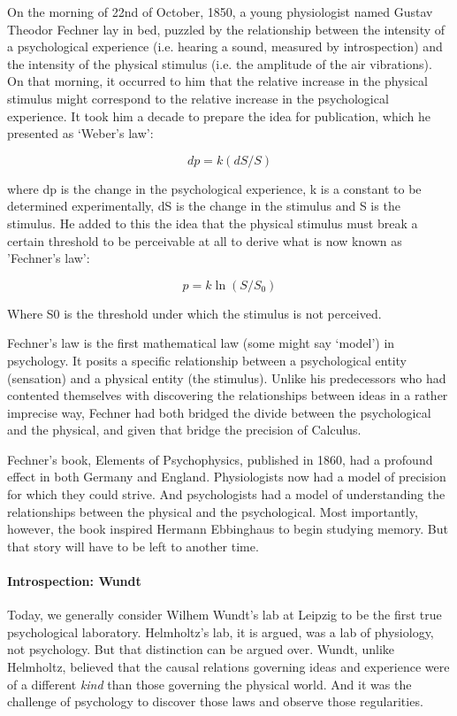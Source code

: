 On the morning of 22nd of October, 1850, a young physiologist named Gustav Theodor Fechner lay in bed, puzzled by the relationship between the intensity of a psychological experience (i.e. hearing a sound, measured by introspection) and the intensity of the physical stimulus (i.e. the amplitude of the air vibrations). On that morning, it occurred to him that the relative increase in the physical stimulus might correspond to the relative increase in the psychological experience. It took him a decade to prepare the idea for publication, which he presented as `Weber's law':

\[ dp  = k(dS/S) \]

where dp is the change in the psychological experience, k is a constant to be determined experimentally, dS is the change in the stimulus and S is the stimulus. He added to this the idea that the physical stimulus must break a certain threshold to be perceivable at all to derive what is now known as 'Fechner's law’:

\[ p = k\ln(S/S_{0}) \] 

Where S0 is the threshold under which the stimulus is not perceived.

Fechner's law is the first mathematical law (some might say `model') in psychology. It posits a specific relationship between a psychological entity (sensation) and a physical entity (the stimulus). Unlike his predecessors who had contented themselves with discovering the relationships between ideas in a rather imprecise way, Fechner had both bridged the divide between the psychological and the physical, and given that bridge the precision of Calculus. 

Fechner's book, Elements of Psychophysics, published in 1860, had a profound effect in both Germany and England. Physiologists now had a model of precision for which they could strive. And psychologists had a model of understanding the relationships between the physical and the psychological. Most importantly, however, the book inspired Hermann Ebbinghaus to begin studying memory. But that story will have to be left to another time.

\paragraph{Introspection: Wundt}
\label{introspection:wundt}

Today, we generally consider Wilhem Wundt's lab at Leipzig to be the first true psychological laboratory. Helmholtz's lab, it is argued, was a lab of physiology, not psychology. But that distinction can be argued over. Wundt, unlike Helmholtz, believed that the causal relations governing ideas and experience were of a different \emph{kind} than those governing the physical world. And it was the challenge of psychology to discover those laws and observe those regularities.

